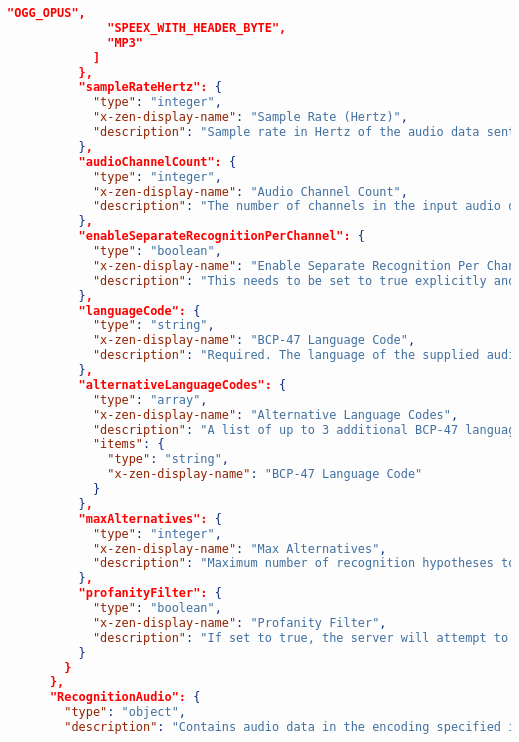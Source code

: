 \begin{lstlisting}[language=json,basicstyle=\ttfamily\tiny,numberstyle=\tiny]
              "OGG_OPUS",
              "SPEEX_WITH_HEADER_BYTE",
              "MP3"
            ]
          },
          "sampleRateHertz": {
            "type": "integer",
            "x-zen-display-name": "Sample Rate (Hertz)",
            "description": "Sample rate in Hertz of the audio data sent in all RecognitionAudio messages. Valid values are: 8000-48000. 16000 is optimal. For best results, set the sampling rate of the audio source to 16000 Hz."
          },
          "audioChannelCount": {
            "type": "integer",
            "x-zen-display-name": "Audio Channel Count",
            "description": "The number of channels in the input audio data. ONLY set this for MULTI-CHANNEL recognition. Valid values for LINEAR16 and FLAC are 1-8. Valid values for OGG_OPUS are '1'-'254'. Valid value for MULAW, AMR, AMR_WB and SPEEX_WITH_HEADER_BYTE is only 1. If 0 or omitted, defaults to one channel (mono)."
          },
          "enableSeparateRecognitionPerChannel": {
            "type": "boolean",
            "x-zen-display-name": "Enable Separate Recognition Per Channel",
            "description": "This needs to be set to true explicitly and audioChannelCount > 1 to get each channel recognized separately."
          },
          "languageCode": {
            "type": "string",
            "x-zen-display-name": "BCP-47 Language Code",
            "description": "Required. The language of the supplied audio as a BCP-47 language tag."
          },
          "alternativeLanguageCodes": {
            "type": "array",
            "x-zen-display-name": "Alternative Language Codes",
            "description": "A list of up to 3 additional BCP-47 language codes, listing possible alternative languages of the supplied audio.",
            "items": {
              "type": "string",
              "x-zen-display-name": "BCP-47 Language Code"
            }
          },
          "maxAlternatives": {
            "type": "integer",
            "x-zen-display-name": "Max Alternatives",
            "description": "Maximum number of recognition hypotheses to be returned."
          },
          "profanityFilter": {
            "type": "boolean",
            "x-zen-display-name": "Profanity Filter",
            "description": "If set to true, the server will attempt to filter out profanities, replacing all but the initial character in each filtered word with asterisks, e.g. 'f***'."
          }
        }
      },
      "RecognitionAudio": {
        "type": "object",
        "description": "Contains audio data in the encoding specified in the RecognitionConfig. Either content or uri must be supplied. Supplying both or neither returns google.rpc.Code.INVALID_ARGUMENT",

\end{lstlisting}
